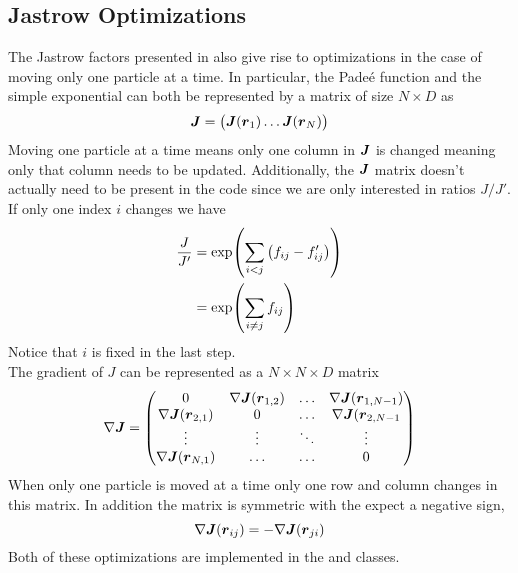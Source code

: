 \subsection{Jastrow Optimizations}
    The Jastrow factors presented in  also give rise to optimizations
    in the case of moving only one particle at a time. In particular, the
    Pade\'e function and the simple exponential can both be represented by a
    matrix of size $N\times D$ as
        \begin{equation}
            \blds{J} = 
                \begin{pmatrix}
                    \blds{J}(\blds{r}_1) \dots \blds{J}(\blds{r}_N)
                \end{pmatrix}
        \end{equation}
    Moving one particle at a time means only one column in $\boldsymbol{{J}}$ is
    changed meaning only that column needs to be updated. Additionally, the
    $\boldsymbol{{J}}$ matrix doesn't actually need to be present in the code since we
    are only interested in ratios $J/J'$. If only one index $i$ changes we have
        \begin{align}
            \frac{J}{J'} &= \exp(\sum\limits_{i<j} \left(f_{ij} - f'_{ij}\right))
            \nonumber \\
            &= \exp(\sum\limits_{i\neq j} f_{ij})
        \end{align}
    Notice that $i$ is fixed in the last step. \\
    The gradient of $J$ can be represented as a $N\times N\times D$ matrix
        \begin{equation}
            \nabla \boldsymbol{{J}} = 
                \begin{pmatrix}
                    0 & \nabla \boldsymbol{{J}}(\boldsymbol{{r}}_{1,2}) & \dots & \nabla
                    \boldsymbol{{J}}(\boldsymbol{{r}}_{1,N-1}) \\
                    \nabla \boldsymbol{{J}}(\boldsymbol{{r}}_{2,1}) & 0 & \dots & \nabla
                    \boldsymbol{{J}}(\boldsymbol{{r}}_{2,N-1} \\
                    \vdots & \vdots & \ddots & \vdots \\
                    \nabla \boldsymbol{{J}}(\boldsymbol{{r}}_{N,1}) & \dots & \dots & 0 
                \end{pmatrix}
        \end{equation}
    When only one particle is moved at a time only one row and column changes
    in this matrix. In addition the matrix is symmetric with the expect a
    negative sign,
        \begin{equation}
            \nabla \boldsymbol{{J}}(\boldsymbol{{r}}_{ij}) = -\nabla\boldsymbol{{J}}(\boldsymbol{{r}}_{ji})
        \end{equation}
    Both of these optimizations are implemented in the 
    and  classes. \\ 

